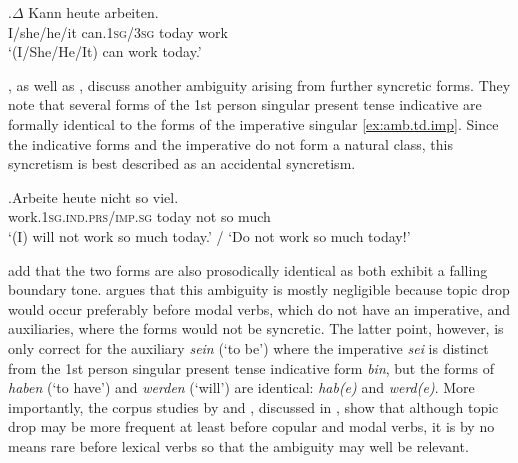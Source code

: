 \exg.\label{ex:amb.td.13}$\Delta$ Kann heute arbeiten.\\
I/she/he/it can.\textsc{1sg}/\textsc{3sg} today work\\
`(I/She/He/It) can work today.'

\citet{poitou1993}, as well as \citet{zifonun.etal1997}, discuss another ambiguity  arising from further syncretic forms.
They note that several forms of the 1st person singular present tense indicative are formally identical to the forms of the imperative  singular \ref{ex:amb.td.imp}.
Since the indicative forms and the imperative  do not form a natural class, this syncretism is best described as an accidental syncretism.

\exg.\label{ex:amb.td.imp}Arbeite heute nicht so viel.\\
work.\textsc{1sg.ind.prs}/\textsc{imp.sg} today not so much\\
`(I) will not work so much today.' / `Do not work so much today!'

\citet[415]{zifonun.etal1997} add that the two forms are also prosodically  identical as both exhibit a falling boundary tone.
\citet{poitou1993} argues that this ambiguity  is mostly negligible because topic drop would occur preferably before modal verbs,  which do not have an imperative,  and auxiliaries, where the forms would not be syncretic.  
The latter point, however, is only correct for the auxiliary  \textit{sein} (`to be') where the imperative  \textit{sei} is distinct from the 1st person singular present tense indicative form \textit{bin}, but the forms of \textit{haben} (`to have') and \textit{werden} (`will') are identical: \textit{hab(e)} and \textit{werd(e)}.
More importantly, the corpus studies by \citet{androutsopoulos.schmidt2002} and \citet{frick2017}, discussed in , show that although topic drop may be more frequent at least before copular  and modal verbs,  it is by no means rare before lexical verbs  so that the ambiguity  may well be relevant.

